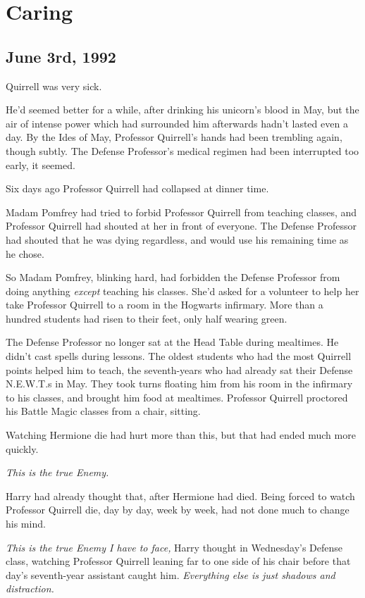 \chapter{Caring}

\section{June 3rd, 1992}

 Quirrell was very sick.

\hplettrineextrapara
He'd seemed better for a while, after drinking his unicorn's blood in May, but the air of intense power which had surrounded him afterwards hadn't lasted even a day. By the Ides of May, Professor Quirrell's hands had been trembling again, though subtly. The Defense Professor's medical regimen had been interrupted too early, it seemed.

Six days ago Professor Quirrell had collapsed at dinner time.

Madam Pomfrey had tried to forbid Professor Quirrell from teaching classes, and Professor Quirrell had shouted at her in front of everyone. The Defense Professor had shouted that he was dying regardless, and would use his remaining time as he chose.

So Madam Pomfrey, blinking hard, had forbidden the Defense Professor from doing anything \emph{except} teaching his classes. She'd asked for a volunteer to help her take Professor Quirrell to a room in the Hogwarts infirmary. More than a hundred students had risen to their feet, only half wearing green.

The Defense Professor no longer sat at the Head Table during mealtimes. He didn't cast spells during lessons. The oldest students who had the most Quirrell points helped him to teach, the seventh-years who had already sat their Defense N.E.W.T.s in May. They took turns floating him from his room in the infirmary to his classes, and brought him food at mealtimes. Professor Quirrell proctored his Battle Magic classes from a chair, sitting.

Watching Hermione die had hurt more than this, but that had ended much more quickly.

\emph{This is the true Enemy.}

Harry had already thought that, after Hermione had died. Being forced to watch Professor Quirrell die, day by day, week by week, had not done much to change his mind.

\emph{This is the true Enemy I have to face,} Harry thought in Wednesday's Defense class, watching Professor Quirrell leaning far to one side of his chair before that day's seventh-year assistant caught him. \emph{Everything else is just shadows and distraction.}

